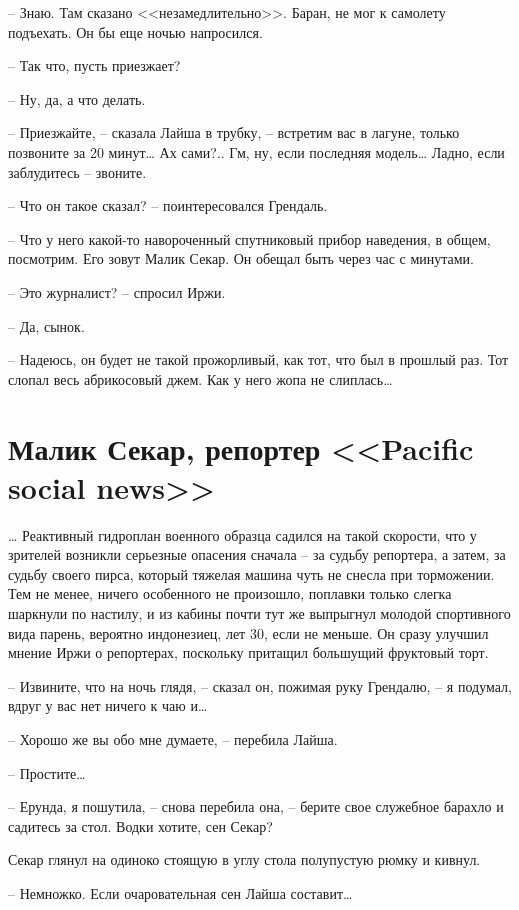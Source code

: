 -- Знаю. Там сказано <<незамедлительно>>. Баран, не мог к самолету подъехать. Он бы еще ночью напросился.

-- Так что, пусть приезжает?

-- Ну, да, а что делать.

-- Приезжайте, -- сказала Лайша в трубку, -- встретим вас в лагуне, только позвоните за 20 минут\ldots{} Ах сами?.. Гм, ну, если последняя модель\ldots{} Ладно, если заблудитесь -- звоните.

-- Что он такое сказал? -- поинтересовался Грендаль.

-- Что у него какой-то навороченный спутниковый прибор наведения, в общем, посмотрим. Его зовут Малик Секар. Он обещал быть через час с минутами.

-- Это журналист? -- спросил Иржи.

-- Да, сынок.

-- Надеюсь, он будет не такой прожорливый, как тот, что был в прошлый раз. Тот слопал весь абрикосовый джем. Как у него жопа не слиплась\ldots{}


\chapter{Малик Секар, репортер <<Pacific social news>>}


\ldots{} Реактивный гидроплан военного образца садился на такой скорости, что у зрителей возникли серьезные опасения сначала -- за судьбу репортера, а затем, за судьбу своего пирса, который тяжелая машина чуть не снесла при торможении. Тем не менее, ничего особенного не произошло, поплавки только слегка шаркнули по настилу, и из кабины почти тут же выпрыгнул молодой спортивного вида парень, вероятно индонезиец, лет 30, если не меньше. Он сразу улучшил мнение Иржи о репортерах, поскольку притащил большущий фруктовый торт.

-- Извините, что на ночь глядя, -- сказал он, пожимая руку Грендалю, -- я подумал, вдруг у вас нет ничего к чаю и\ldots{}

-- Хорошо же вы обо мне думаете, -- перебила Лайша.

-- Простите\ldots{}

-- Ерунда, я пошутила, -- снова перебила она, -- берите свое служебное барахло и садитесь за стол. Водки хотите, сен Секар?

Секар глянул на одиноко стоящую в углу стола полупустую рюмку и кивнул.

-- Немножко. Если очаровательная сен Лайша составит\ldots{}

